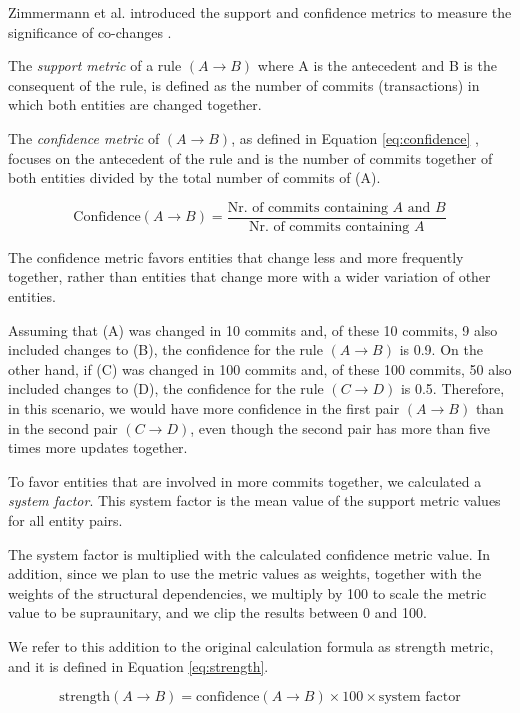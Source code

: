 \documentclass{ieeeaccess}
\begin{document}
Zimmermann et al. introduced the support and confidence metrics to measure the significance of co-changes \cite{b7}.

The \textit{support metric} of a rule $(A \rightarrow B)$ where A is the antecedent and B is the consequent of the rule, is defined as the number of commits (transactions) in which both entities are changed together.

The \textit{confidence metric} of $(A \rightarrow B)$, as defined in Equation \eqref{eq:confidence} , focuses on the antecedent of the rule and is the number of commits together of both entities divided by the total number of commits of (A).


\begin{equation}
\text{Confidence}(A \rightarrow B) = \frac{\text{Nr. of commits containing } A \text{ and } B}{\text{Nr. of commits containing } A}
\label{eq:confidence}
\end{equation}


The confidence metric favors entities that change less and more frequently together, rather than entities that change more with a wider variation of other entities.

Assuming that (A) was changed in 10 commits and, of these 10 commits, 9 also included changes to (B), the confidence for the rule $(A \rightarrow B)$ is 0.9. On the other hand, if (C) was changed in 100 commits and, of these 100 commits, 50 also included changes to (D), the confidence for the rule $(C \rightarrow D)$ is 0.5. Therefore, in this scenario, we would have more confidence in the first pair $(A \rightarrow B)$ than in the second pair $(C \rightarrow D)$, even though the second pair has more than five times more updates together.

To favor entities that are involved in more commits together, we calculated a \textit{system factor}. This system factor is the mean value of the support metric values for all entity pairs.

The system factor is multiplied with the calculated confidence metric value. In addition, since we plan to use the metric values as weights, together with the weights of the structural dependencies, we multiply by 100 to scale the metric value to be supraunitary, and we clip the results between 0 and 100.


We refer to this addition to the original calculation formula as strength metric, and it is defined in Equation \eqref{eq:strength}.

\begin{equation}
\text{strength}(A \rightarrow B) = \text{confidence}(A \rightarrow B) \times 100 \times \text{system factor} 
\label{eq:strength}
\end{equation}
\end{document}
